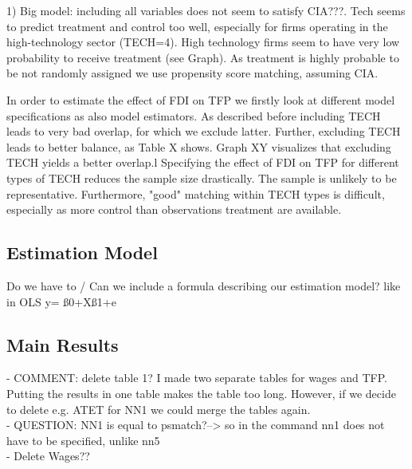 \documentclass[a4paper,11pt]{scrartcl}
\begin{document}
1) Big model: including all variables does not seem to satisfy CIA???. Tech seems to predict treatment and control too well, especially for firms operating in the high-technology sector (TECH=4). High technology firms seem to have very low probability to receive treatment (see Graph). 
As treatment is  highly probable to be not randomly assigned we use propensity score matching, assuming CIA. 

In order to estimate the effect of FDI on TFP we firstly look at different model specifications as also model estimators. 
As described before including TECH leads to very bad overlap, for which we exclude latter. Further, excluding TECH leads to better balance, as Table X shows.   Graph XY visualizes that excluding TECH yields a better overlap.l
Specifying the effect of FDI on TFP for different types of TECH reduces the sample size drastically. The sample is unlikely to be representative. 
Furthermore, "good" matching within TECH types is difficult, especially as more control  than observations treatment are available. 

\subsection{Estimation Model}

Do we have to / Can we include a formula describing our estimation model? 
like in OLS y= ß0+Xß1+e


\subsection{Main Results}
- COMMENT: delete table 1?  I made two separate tables for wages and TFP. Putting the results in one table makes the table too long. However, if we decide to delete e.g. ATET for NN1 we could merge the tables again. \\
- QUESTION: NN1 is equal to psmatch?--> so in the command nn1 does not have to be specified, unlike nn5\\
- Delete Wages??\\
\end{document}
